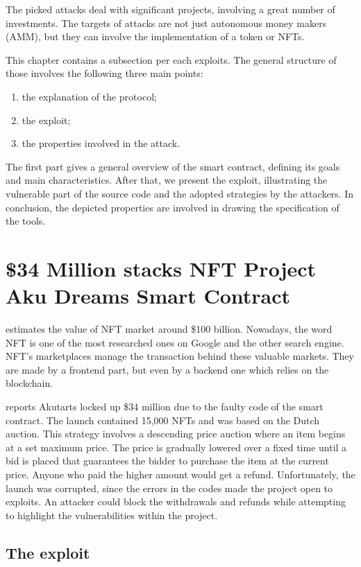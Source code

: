 The picked attacks deal with significant projects, involving a great number of investments. 
The targets of attacks are not just autonomous money makers (AMM), but they can involve the implementation of a token or NFTs.

This chapter contains a subsection per each exploits. The general structure of those involves the following three main points:
\begin{enumerate}
    \item the explanation of the protocol;
    \item the exploit;
    \item the properties involved in the attack.
\end{enumerate}
The first part gives a general overview of the smart contract, 
defining its goals and main characteristics. 
After that, we present the exploit, illustrating the vulnerable part of the source code and the adopted strategies 
by the attackers.
In conclusion, the depicted properties are involved in drawing the specification of the tools.



\section{\$34 Million stacks NFT Project Aku Dreams Smart Contract}
\label{sec:Exploits:AkuDreams}
\citet{NFTValue} estimates the value of NFT market around \$100 billion.
Nowadays, the word NFT is one of the most researched ones on Google and the other search engine.
NFT's marketplaces manage the transaction behind these valuable markets. 
They are made by a frontend part, but even by a backend one which relies on the blockchain. 

\citet{Aku} reports Akutarts locked up \$34 million due to the faulty code of the smart contract.
The launch contained 15,000  NFTs and was based on the Dutch auction. This strategy involves a descending price auction where an item begins at a set maximum price. 
The price is gradually lowered over a fixed time until a bid is placed that guarantees the bidder to purchase the item at the current price. 
Anyone who paid the higher amount would get a refund.
Unfortunately, the launch was corrupted, since the errors in the codes made the project open to exploits. 
An attacker could block the withdrawals and refunds while attempting to highlight the vulnerabilities within the project.

\subsection{The exploit}
\label{sec:AkuDreams:AkutarsExploit}

